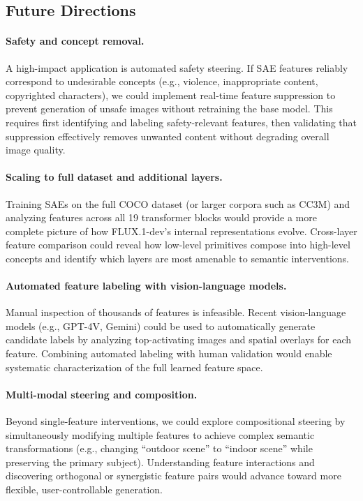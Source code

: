 \documentclass{article}
\begin{document}
\subsection{Future Directions}

\paragraph{Safety and concept removal.}
A high-impact application is automated safety steering.
If SAE features reliably correspond to undesirable concepts (e.g., violence, inappropriate content, copyrighted characters), we could implement real-time feature suppression to prevent generation of unsafe images without retraining the base model.
This requires first identifying and labeling safety-relevant features, then validating that suppression effectively removes unwanted content without degrading overall image quality.

\paragraph{Scaling to full dataset and additional layers.}
Training SAEs on the full COCO dataset (or larger corpora such as CC3M) and analyzing features across all 19 transformer blocks would provide a more complete picture of how FLUX.1-dev's internal representations evolve.
Cross-layer feature comparison could reveal how low-level primitives compose into high-level concepts and identify which layers are most amenable to semantic interventions.

\paragraph{Automated feature labeling with vision-language models.}
Manual inspection of thousands of features is infeasible.
Recent vision-language models (e.g., GPT-4V, Gemini) could be used to automatically generate candidate labels by analyzing top-activating images and spatial overlays for each feature.
Combining automated labeling with human validation would enable systematic characterization of the full learned feature space.

\paragraph{Multi-modal steering and composition.}
Beyond single-feature interventions, we could explore compositional steering by simultaneously modifying multiple features to achieve complex semantic transformations (e.g., changing ``outdoor scene'' to ``indoor scene'' while preserving the primary subject).
Understanding feature interactions and discovering orthogonal or synergistic feature pairs would advance toward more flexible, user-controllable generation.
\end{document}
